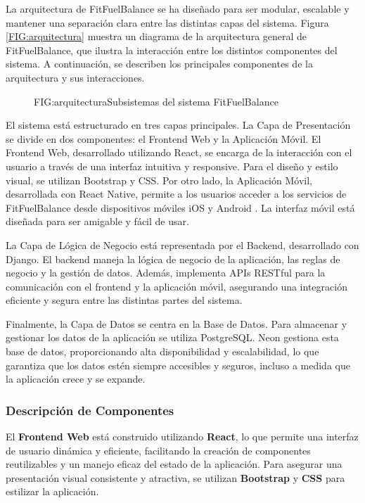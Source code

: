 La arquitectura de FitFuelBalance se ha diseñado para ser modular, escalable y mantener una separación clara entre las distintas capas del sistema. Figura \ref{FIG:arquitectura} muestra un diagrama de la arquitectura general de FitFuelBalance, que ilustra la interacción entre los distintos componentes del sistema. A continuación, se describen los principales componentes de la arquitectura y sus interacciones.

\begin{figure}[Distribución Arquitectura]{FIG:arquitectura}{Subsistemas del sistema FitFuelBalance}
\end{figure}

El sistema está estructurado en tres capas principales. La Capa de Presentación se divide en dos componentes: el Frontend Web y la Aplicación Móvil. El Frontend Web, desarrollado utilizando React, se encarga de la interacción con el usuario a través de una interfaz intuitiva y responsive. Para el diseño y estilo visual, se utilizan Bootstrap y CSS. Por otro lado, la Aplicación Móvil, desarrollada con React Native, permite a los usuarios acceder a los servicios de FitFuelBalance desde dispositivos móviles iOS \cite{iOS} y Android \cite{Android}. La interfaz móvil está diseñada para ser amigable y fácil de usar.

La Capa de Lógica de Negocio está representada por el Backend, desarrollado con Django. El backend maneja la lógica de negocio de la aplicación, las reglas de negocio y la gestión de datos. Además, implementa APIs RESTful \cite{RESTfulAPI} para la comunicación con el frontend y la aplicación móvil, asegurando una integración eficiente y segura entre las distintas partes del sistema.

Finalmente, la Capa de Datos se centra en la Base de Datos. Para almacenar y gestionar los datos de la aplicación se utiliza PostgreSQL. Neon gestiona esta base de datos, proporcionando alta disponibilidad y escalabilidad, lo que garantiza que los datos estén siempre accesibles y seguros, incluso a medida que la aplicación crece y se expande.

\subsubsection{Descripción de Componentes}

    El \textbf{Frontend Web} está construido utilizando \textbf{React}, lo que permite una interfaz de usuario dinámica y eficiente, facilitando la creación de componentes reutilizables y un manejo eficaz del estado de la aplicación. Para asegurar una presentación visual consistente y atractiva, se utilizan \textbf{Bootstrap} y \textbf{CSS} para estilizar la aplicación.
    
